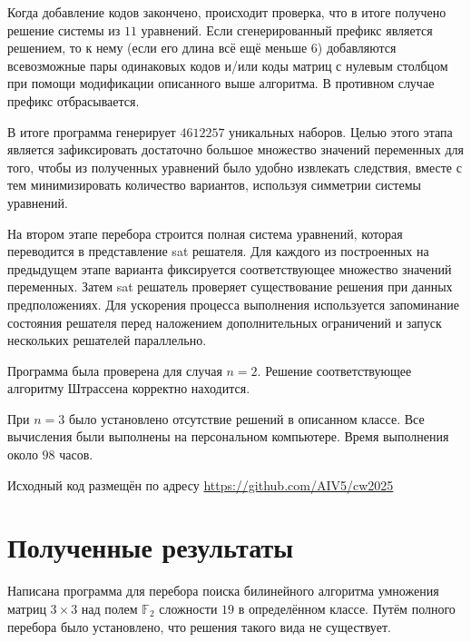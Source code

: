 \documentclass[12pt]{article}
\begin{document}
Когда добавление кодов закончено, происходит проверка, что в итоге получено решение системы из $11$ уравнений. Если сгенерированный префикс является решением, то к нему (если его длина всё ещё меньше $6$) добавляются всевозможные пары одинаковых кодов и/или коды матриц с нулевым столбцом при помощи модификации описанного выше алгоритма. В противном случае префикс отбрасывается.

В итоге программа генерирует $4612257$ уникальных наборов. Целью этого этапа является зафиксировать достаточно большое множество значений переменных для того, чтобы из полученных уравнений было удобно извлекать следствия, вместе с тем минимизировать количество вариантов, используя симметрии системы уравнений.

На втором этапе перебора строится полная система уравнений, которая переводится в представление sat решателя. Для каждого из построенных на предыдущем этапе варианта фиксируется соответствующее множество значений переменных. Затем sat решатель проверяет существование решения при данных предположениях. Для ускорения процесса выполнения используется запоминание состояния решателя перед наложением дополнительных ограничений и запуск нескольких решателей параллельно.

Программа была проверена для случая $n = 2$. Решение соответствующее алгоритму Штрассена корректно находится.

При $n = 3$ было установлено отсутствие решений в описанном классе. Все вычисления были выполнены на персональном компьютере. Время выполнения около $98$ часов. 

Исходный код размещён по адресу \url{https://github.com/AIV5/cw2025}

\section{Полученные результаты}

Написана программа для перебора поиска билинейного алгоритма умножения матриц $3 \times 3$ над полем $\mathbb F_2$ сложности $19$ в определённом классе. Путём полного перебора было установлено, что решения такого вида не существует.
\end{document}
